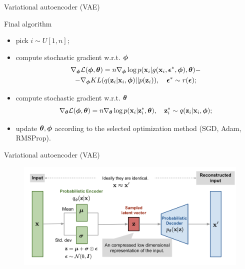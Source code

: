 \begin{frame}{Variational autoencoder (VAE)}
	\begin{block}{Final algorithm}
		\begin{itemize}
			\item pick $i \sim U[1, n]$;
			\item compute stochastic gradient w.r.t. $\boldsymbol{\phi}$
				\begin{multline*}
					\nabla_{\boldsymbol{\phi}} \mathcal{L} (\boldsymbol{\phi}, \boldsymbol{\theta}) = n \nabla_{\boldsymbol{\phi}} \log p(\mathbf{x}_i | g(\mathbf{x}_i, \boldsymbol{\epsilon}^*, \boldsymbol{\phi}), \boldsymbol{\theta}) - \\ - \nabla_{\boldsymbol{\phi}} KL (q(\mathbf{z}_i|\mathbf{x}_i, \boldsymbol{\phi}) || p(\mathbf{z}_i)), \quad \boldsymbol{\epsilon}^* \sim r(\boldsymbol{\epsilon});
				\end{multline*}
			\item compute stochastic gradient w.r.t. $\boldsymbol{\theta}$
			\[
			\nabla_{\boldsymbol{\theta}} \mathcal{L} (\boldsymbol{\phi}, \boldsymbol{\theta}) = n \nabla_{\boldsymbol{\theta}} \log p(\mathbf{x}_i|\mathbf{z}^*_i, \boldsymbol{\theta}), \quad \mathbf{z}^*_i \sim q(\mathbf{z}_i|\mathbf{x}_i, \boldsymbol{\phi});
			\]
			\item update $\boldsymbol{\theta}, \boldsymbol{\phi}$ according to the selected optimization method (SGD, Adam, RMSProp).
		\end{itemize}
	\end{block}
\end{frame}
\begin{frame}{Variational autoencoder (VAE)}

\begin{figure}[h]
	\centering
	\includegraphics[width=\linewidth]{figs/vae-gaussian.png}
\end{figure}

\end{frame}
